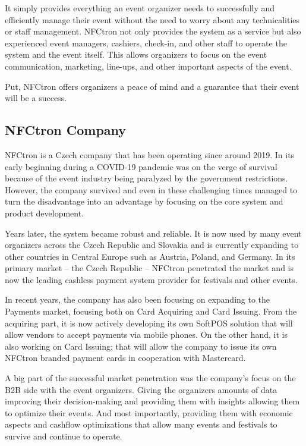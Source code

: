 It simply provides everything an event organizer needs to successfully and efficiently manage their event without the need to worry about any technicalities or staff management.
NFCtron not only provides the system as a service but also experienced event managers, cashiers, check-in, and other staff to operate the system and the event itself.
This allows organizers to focus on the event communication, marketing, line-ups, and other important aspects of the event.

Put, NFCtron offers organizers a peace of mind and a guarantee that their event will be a success.

\subsection*{NFCtron Company}
\label{subsec:introduction-background-motivation-nfctron}
NFCtron is a Czech company that has been operating since around 2019.
In its early beginning during a COVID-19 pandemic was on the verge of survival because of the event industry being paralyzed by the government restrictions.
However, the company survived and even in these challenging times managed to turn the disadvantage into an advantage by focusing on the core system and product development\cite{nfctron_en_about_us}.

Years later, the system became robust and reliable.
It is now used by many event organizers across the Czech Republic and Slovakia and is currently expanding to other countries in Central Europe such as Austria\cite{nfctron_blog_nfctron_austria_events_festivals_september_visitors_payments}, Poland, and Germany.
In its primary market – the Czech Republic – NFCtron penetrated the market and is now the leading cashless payment system provider for festivals and other events.

In recent years, the company has also been focusing on expanding to the Payments market, focusing both on Card Acquiring and Card Issuing.
From the acquiring part, it is now actively developing its own SoftPOS solution that will allow vendors to accept payments via mobile phones.
On the other hand, it is also working on Card Issuing; that will allow the company to issue its own NFCtron branded payment cards in cooperation with Mastercard\cite{nfctron_blog_nfctron_keynote_mastercard_cashless_event}.

A big part of the successful market penetration was the company's focus on the B2B side with the event organizers.
Giving the organizers amounts of data improving their decision-making and providing them with insights allowing them to optimize their events.
And most importantly, providing them with economic aspects and cashflow optimizations that allow many events and festivals to survive and continue to operate.

